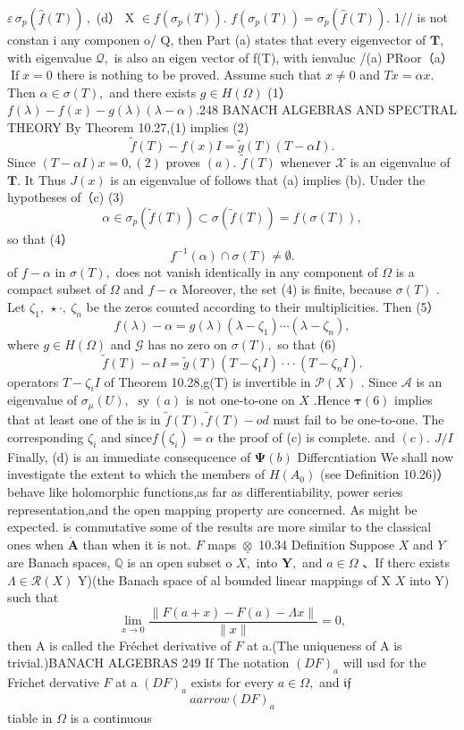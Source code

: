 $\varepsilon\,\sigma_{p}({\widehat{f}}(T))\,,$ (d） X $\in f(\sigma_{p}(T)).$ $f(\sigma_{p}(T))=\sigma_{p}({\hat{f}}(T)).$ 1// is not constan i any componen o/ Q, then Part (a) states that every eigenvector of ${\boldsymbol{T}},$ with eigenvalue ${\mathcal{Q}},$ is also an eigen vector of f(T), with ienvaluc /(a) PRoor（a） $\operatorname{If}x=0$ there is nothing to be proved. Assume such that $x\neq0$ and $T x=\alpha x.$ Then $\alpha\in\sigma(T),$ and there exists $g\in H(\Omega)$ (1） $f(\lambda)-f(x)-g(\lambda)(\lambda-\alpha).$248 BANACH ALGEBRAS AND SPECTRAL THEORY By Theorem 10.27,(1) implies (2) $$ {\tilde{f}}(T)-f(x)I={\tilde{g}}(T)(T-\alpha I). $$ Since $(T-\alpha I)x=0,(2)$ proves $(a).$ ${\tilde{f}}(T)$ whenever $\scriptstyle{\mathcal{X}}$ is an eigenvalue of ${\boldsymbol{T}}.$ It Thus $J(x)$ is an eigenvalue of follows that (a) implies (b). Under the hypotheses of（c) (3) $$ \alpha\in\sigma_{p}(\widetilde{f}(T))\subset\sigma(\widetilde{f}(T))=f(\sigma(T)), $$ so that (4） $$ f^{-1}(\alpha)\cap\sigma(T)\neq\emptyset. $$ of $f-\alpha$ in $\sigma(T),$ does not vanish identically in any component of $\Omega$ is a compact subset of $\Omega$ and $f-\alpha$ Moreover, the set (4) is finite, because $\sigma(T)$ . Let $\zeta_{1},\ \star\cdot,\ \zeta_{n}$ be the zeros counted according to their multiplicities. Then (5） $$ f(\lambda)-\alpha=g(\lambda)(\lambda-\zeta_{1})\cdots(\lambda-\zeta_{n}), $$ where $g\in H(\Omega)$ and ${\mathcal{G}}$ has no zero on $\sigma(T),$ so that (6) $$ {\tilde{f}}(T)-\alpha I={\tilde{g}}(T)(T-\zeta_{1}I)\cdot\cdot\cdot(T-\zeta_{n}I). $$ operators $T-\zeta_{i}I$ of Theorem 10.28,g(T) is invertible in ${\mathcal{P}}(X)$ . Since $\scriptstyle{\mathcal{A}}$ is an eigenvalue of $\sigma_{\mu}(U),$ $\operatorname{sy}(a)$ is not one-to-one on $\textstyle X$ .Hence $\mathbf{\tau}(6)$ implies that at least one of the is in $\tilde{f}(T),\tilde{f}(T)-o d$ must fail to be one-to-one. The corresponding $\zeta_{i}$ and $\mathrm{since}f(\zeta_{i})=\alpha$ the proof of (c) is complete. and $(c).$ $J/I$ Finally, (d) is an immediate consequcence of $\mathbf{\Psi}(b)$ Differcntiation We shall now investigate the extent to which the members of $H(A_{0})$ (see Definition 10.26)） behave like holomorphic functions,as far as differentiability, power series representation,and the open mapping property are concerned. As might be expected. is commutative some of the results are more similar to the classical ones when $\scriptstyle{\dot{\boldsymbol{A}}}$ than when it is not. ${\mathbf{}}F$ maps $\underline{{\otimes}}$ 10.34 Definition Suppose $\textstyle X$ and ${\mathbf{}}Y$ are Banach spaces, $\mathbb{Q}$ is an open subset o $X,$ into ${\boldsymbol{Y}},$ and $a\in\Omega$ 、If therc exists $\Lambda\in{\mathcal{R}}(X)$ Y)(the Banach space of al bounded linear mappings of X $\textstyle X$ into Y) such that $$ \operatorname*{lim}_{x\to0}{\frac{\|F(a+x)-F(a)-\Lambda x\|}{\|x\|}}=0, $$ then A is called the Fréchet derivative of ${\mathbf{}}F$ at a.(The uniqueness of A is trivial.)BANACH ALGEBRAS 249 If The notation $(D F)_{a}$ will usd for the Frichet dervative ${\mathbf{}}F$ at a $(D F)_{a}$ exists for every $a\in\Omega,$ and ${\mathfrak{i}}{\mathfrak{f}}$ $$ a arrow(D F)_{a} $$ tiable in $\Omega$ is a continuous 